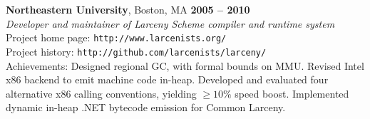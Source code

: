 \documentclass[margin,line,draft]{res}
\def\noneed#1{}
\begin{document}
\begin{resume}
    \textbf{Northeastern University}, Boston, MA \hfill \textbf{2005 -- 2010}\\\vspace{1mm}%
    \textsl{Developer and maintainer of Larceny Scheme compiler and runtime system} \\
    Project home page: {\tt http://www.larcenists.org/} \\
    Project history: {\tt http://github.com/larcenists/larceny/}\\
    Achievements: Designed regional GC, with formal bounds on MMU. Revised Intel x86 backend to emit machine code in-heap. Developed and evaluated four alternative x86 calling conventions, yielding $\geq 10\%$ speed boost. Implemented dynamic in-heap .NET bytecode emission for Common Larceny.
    \vspace{-2mm}
% 
% 
% 
% 
% 


\end{resume}
\end{document}
